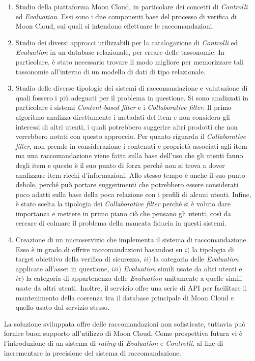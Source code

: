 \documentclass[10pt,a4paper]{article}
\begin{document}
\begin{enumerate}
    \item Studio della piattaforma Moon Cloud, in particolare dei concetti di \textit{Controlli} ed \textit{Evaluation}. 
    Essi sono i due componenti base del processo di verifica di Moon Cloud, sui quali si intendono effettuare le raccomandazioni.
    \item Studio dei diversi approcci utilizzabili per la catalogazione di \textit{Controlli} ed \textit{Evaluation} in un database 
    relazionale, per creare delle tassonomie. In particolare, è stato necessario trovare il modo migliore per memorizzare tali tassonomie all'interno 
    di un modello di dati di tipo relazionale.
    \item Studio delle diverse tipologie dei sistemi di raccomandazione e valutazione di quali fossero i più adeguati per il problema in questione. 
    Si sono analizzati in particolare i sistemi \textit{Content-based filter} e i \textit{Collaborative filter}.\hfill\break
    Il primo algoritmo analizza direttamente i metadati del item e non considera gli interessi di altri utenti, i quali potrebbero 
    suggerire altri prodotti che non verrebbero notati con questo approccio. 
    Per quanto riguarda il \textit{Collaborative filter}, non prende in considerazione i contenuti e proprietà associati agli item ma una raccomandazione 
    viene fatta sulla base dell'uso che gli utenti fanno degli item e questo è il suo punto 
    di forza perché non si trova a dover analizzare item ricchi d’informazioni. Allo stesso tempo è anche il suo punto debole, perché può 
    portare suggerimenti che potrebbero essere considerati poco adatti sulla base della poca relazione con i profili di alcuni utenti.\hfill\break
    Infine, è stato scelta la tipologia dei \textit{Collaborative filter} perché si è voluto dare importanza e mettere in primo piano ciò che 
    pensano gli utenti, così da cercare di colmare il problema della mancata fiducia in questi sistemi. 
    \item Creazione di un microservizio che implementa il sistema di raccomandazione. Esso è in grado di offrire raccomandazioni basandosi 
    su $i)$ la tipologia di target obiettivo della verifica di sicurezza, $ii)$ la categoria delle \textit{Evaluation} applicate all’asset in questione, 
    $iii)$ \textit{Evaluation} simili usate da altri utenti e $iv)$ la categoria di appartenenza delle \textit{Evaluation} unitamente a quelle simili 
    usate da altri utenti. Inoltre, il servizio offre una serie di API per facilitare il mantenimento della coerenza tra il database principale di 
    Moon Cloud e quello usato dal servizio stesso.
\end{enumerate}
%
La soluzione sviluppata offre delle raccomandazioni non sofisticate, tuttavia può fornire buon supporto all'utilizzo di Moon Cloud. Come prospettiva futura 
vi è l'introduzione di un sistema di \textit{rating} di \textit{Evaluation} e \textit{Controlli}, al fine di incrementare la precisione del sistema di 
raccomandazione.
\end{document}
